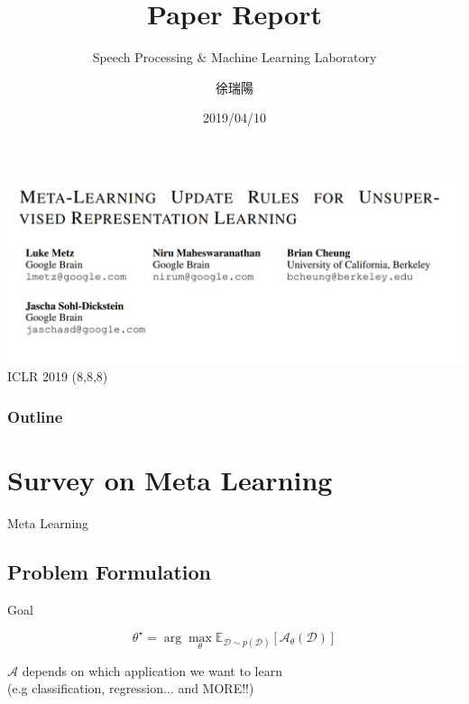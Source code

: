 \documentclass{beamer}
\title{Paper Report}
\subtitle{\textcolor[rgb]{0.00,0.50,1.00}{{Speech Processing \& Machine Learning Laboratory}}}
\author{徐瑞陽}
\date{2019/04/10}
\newcommand{\weib}{\CJKfamily{weib}}
\begin{document}
\begin{frame}
\maketitle
\end{frame}

\begin{frame}
  \includegraphics[width=\textwidth]{fig/title.png}
  \center ICLR 2019
  \center (8,8,8)
\end{frame}


\begin{frame}
\frametitle{Outline}
\tableofcontents
\end{frame}

\section{Survey on Meta Learning}
\begin{frame}
	\begin{center}
    \LARGE{Meta Learning}
	\end{center}
\end{frame}
\subsection{Problem Formulation}
\begin{frame}{Goal}

\[ \theta^\star = \arg \max_\theta \mathbb{E}_{\mathcal{D} \sim p(\mathcal{D}) }[\mathcal{A}_\theta(\mathcal{D})]\]

$\mathcal{A}$ depends on which application we want to learn \\ 
(e.g classification, regression... and MORE!!)
\end{frame}
\end{document}
